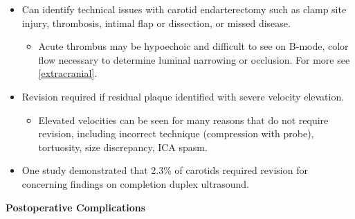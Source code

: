 \documentclass[
]{book}
\providecommand{\tightlist}{%
  \setlength{\itemsep}{0pt}\setlength{\parskip}{0pt}}
\begin{document}
\begin{itemize}
  \begin{itemize}
  \item
    Can identify technical issues with carotid endarterectomy such
    as clamp site injury, thrombosis, intimal flap or dissection, or
    missed disease.\citep{lipski1996}

    \begin{itemize}
    \tightlist
    \item
      Acute thrombus may be hypoechoic and difficult to see on
      B-mode, color flow necessary to determine luminal narrowing
      or occlusion. For more see \ref{extracranial}.
    \end{itemize}
  \item
    Revision required if residual plaque identified with severe
    velocity elevation.\citep{weinstein2015}

    \begin{itemize}
    \tightlist
    \item
      Elevated velocities can be seen for many reasons that do not
      require revision, including incorrect technique (compression
      with probe), tortuosity, size discrepancy, ICA
      spasm.\citep{ricco2013, weinstein2015}
    \end{itemize}
  \item
    One study demonstrated that 2.3\% of carotids required revision
    for concerning findings on completion duplex
    ultrasound.\citep{ascher2004}
  \end{itemize}
\end{itemize}

\textbf{Postoperative Complications}
\end{document}
